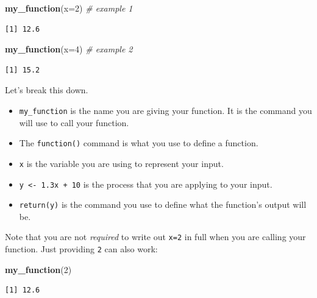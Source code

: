\documentclass[
]{book}
\newenvironment{Shaded}{\begin{snugshade}}{\end{snugshade}}
\newcommand{\CommentTok}[1]{\textcolor[rgb]{0.56,0.35,0.01}{\textit{#1}}}
\newcommand{\DataTypeTok}[1]{\textcolor[rgb]{0.13,0.29,0.53}{#1}}
\newcommand{\DecValTok}[1]{\textcolor[rgb]{0.00,0.00,0.81}{#1}}
\newcommand{\KeywordTok}[1]{\textcolor[rgb]{0.13,0.29,0.53}{\textbf{#1}}}
\newcommand{\NormalTok}[1]{#1}
\providecommand{\tightlist}{%
  \setlength{\itemsep}{0pt}\setlength{\parskip}{0pt}}
\begin{document}
\begin{Shaded}
\begin{Highlighting}[]
\KeywordTok{my_function}\NormalTok{(}\DataTypeTok{x=}\DecValTok{2}\NormalTok{) }\CommentTok{# example 1}
\end{Highlighting}
\end{Shaded}

\begin{verbatim}
[1] 12.6
\end{verbatim}

\begin{Shaded}
\begin{Highlighting}[]
\KeywordTok{my_function}\NormalTok{(}\DataTypeTok{x=}\DecValTok{4}\NormalTok{) }\CommentTok{# example 2}
\end{Highlighting}
\end{Shaded}

\begin{verbatim}
[1] 15.2
\end{verbatim}

Let's break this down.

\begin{itemize}
\tightlist
\item
  \texttt{my\_function} is the name you are giving your function. It is the command you will use to call your function.
\item
  The \texttt{function()} command is what you use to define a function.
\item
  \texttt{x} is the variable you are using to represent your input.
\item
  \texttt{y\ \textless{}-\ 1.3x\ +\ 10} is the process that you are applying to your input.
\item
  \texttt{return(y)} is the command you use to define what the function's output will be.
\end{itemize}

Note that you are not \emph{required} to write out \texttt{x=2} in full when you are calling your function. Just providing \texttt{2} can also work:

\begin{Shaded}
\begin{Highlighting}[]
\KeywordTok{my_function}\NormalTok{(}\DecValTok{2}\NormalTok{)}
\end{Highlighting}
\end{Shaded}

\begin{verbatim}
[1] 12.6
\end{verbatim}
\end{document}
